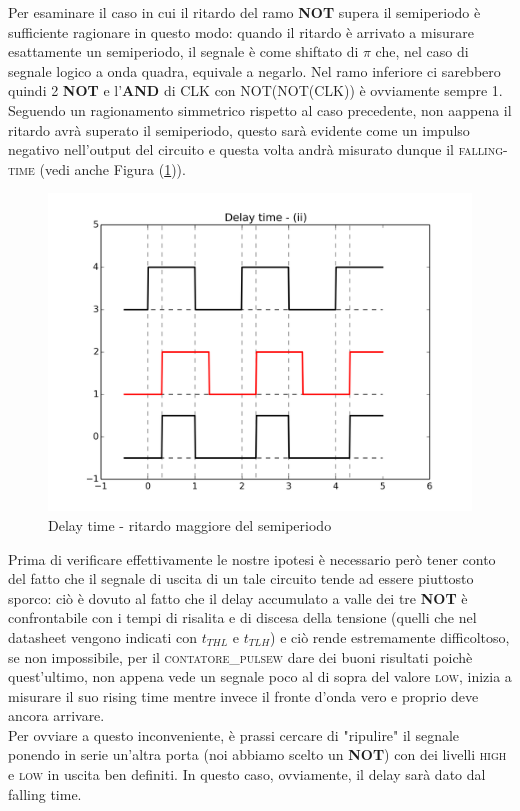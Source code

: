 \documentclass[journal, a4paper]{IEEEtran}
\begin{document}
Per esaminare il caso in cui il ritardo del ramo \textbf{NOT} supera il semiperiodo è sufficiente ragionare in questo modo: quando il ritardo è arrivato a misurare esattamente un semiperiodo, il segnale è come shiftato di $\pi$ che, nel caso di segnale logico a onda quadra, equivale a negarlo. Nel ramo inferiore ci sarebbero quindi 2 \textbf{NOT} e l'\textbf{AND} di \textsc{CLK} con NOT(NOT(CLK)) è ovviamente sempre 1. Seguendo un ragionamento simmetrico rispetto al caso precedente, non aappena il ritardo avrà superato il semiperiodo, questo sarà evidente come un impulso negativo nell'output del circuito e questa volta andrà misurato dunque il \textsc{falling-time} (vedi anche Figura (\ref{fig:delay2})).\\ 

\begin{figure}
\centering
\includegraphics[width=0.7\linewidth]{./delay2}
\caption{Delay time - ritardo maggiore del semiperiodo}
\label{fig:delay2}
\end{figure}


Prima di verificare effettivamente le nostre ipotesi è necessario però tener conto del fatto che il segnale di uscita di un tale circuito tende ad essere piuttosto sporco: ciò è dovuto al fatto che il delay accumulato a valle dei tre \textbf{NOT} è confrontabile con i tempi di risalita e di discesa della tensione (quelli che nel datasheet vengono indicati con $t_{THL}$ e $t_{TLH}$) e ciò rende estremamente difficoltoso, se non impossibile, per il \textsc{contatore\_pulsew} dare dei buoni risultati poichè quest'ultimo, non appena vede un segnale poco al di sopra del valore \textsc{low}, inizia a misurare il suo rising time mentre invece il fronte d'onda vero e proprio deve ancora arrivare.\\
Per ovviare a questo inconveniente, è prassi cercare di "ripulire" il segnale ponendo in serie un'altra porta (noi abbiamo scelto un \textbf{NOT}) con dei livelli \textsc{high} e \textsc{low} in uscita ben definiti. In questo caso, ovviamente, il delay sarà dato dal falling time.\\
\end{document}

